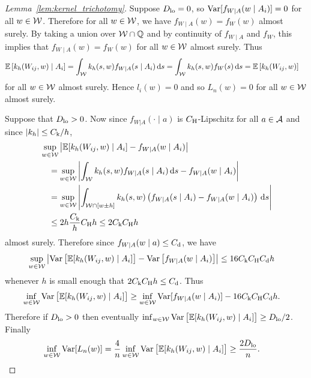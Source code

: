 \begin{proof}[Lemma~\ref{lem:kernel_trichotomy}]


  Suppose
  $D_{\textup{lo}} = 0$, so
  $\operatorname{Var}[f_{W \mid A}(w \mid A_i)] = 0$
  for all $w \in \mathcal{W}$.
  Therefore for all $w \in \mathcal{W}$,
  we have $f_{W \mid A}(w) = f_W(w)$ almost surely.
  By taking a union over $\mathcal{W} \cap \mathbb{Q}$
  and by continuity of $f_{W \mid A}$ and $f_W$,
  this implies that $f_{W \mid A}(w) = f_W(w)$
  for all $w \in \mathcal{W}$
  almost surely. Thus
  \begin{align*}
    \mathbb{E}\left[
      k_h(W_{i j},w) \mid A_i
    \right]
    &=
    \int_{\mathcal{W}}
    k_h(s,w)
    f_{W \mid A}(s \mid A_i)
    \,\mathrm{d}s
    =
    \int_{\mathcal{W}}
    k_h(s,w)
    f_W(s)
    \,\mathrm{d}s
    =
    \mathbb{E}\left[
      k_h(W_{i j},w)
    \right]
  \end{align*}
  for all $w \in \mathcal{W}$ almost surely.
  Hence $l_i(w) = 0$ and so $L_n(w) = 0$
  for all $w \in \mathcal{W}$ almost surely.


  Suppose that $D_{\textup{lo}} > 0$.
  Now since $f_{W|A}(\cdot \mid a)$ is $C_{\mathrm{H}}$-Lipschitz
  for all $a \in \mathcal{A}$ and since $|k_h| \leq C_{\mathrm{k}}/h$,
  \begin{align*}
    &\sup_{w \in \mathcal{W}}
    \left|
    \mathbb{E}[k_h(W_{i j},w) \mid A_i]
    - f_{W \mid A}(w \mid A_i)
    \right| \\
    &\quad=
    \sup_{w \in \mathcal{W}}
    \left|
    \int_{\mathcal{W}}
    k_h(s,w)
    f_{W \mid A}(s \mid A_i)
    \,\mathrm{d}s
    - f_{W \mid A}(w \mid A_i)
    \right| \\
    &\quad=
    \sup_{w \in \mathcal{W}}
    \left|
    \int_{\mathcal{W} \cap [w \pm h]}
    k_h(s,w)
    \left(
      f_{W \mid A}(s \mid A_i)
      - f_{W \mid A}(w \mid A_i)
    \right)
    \,\mathrm{d}s
    \right| \\
    &\quad\leq
    2h
    \frac{C_{\mathrm{k}}}{h}
    C_{\mathrm{H}} h
    \leq
    2 C_{\mathrm{k}} C_{\mathrm{H}} h
  \end{align*}
  almost surely.
  Therefore since $f_{W \mid A}(w \mid a) \leq C_{\mathrm{d}}$,
  we have
  \begin{align*}
    \sup_{w \in \mathcal{W}}
    \left|
    \operatorname{Var}\big[
      \mathbb{E}[k_h(W_{i j},w) \mid A_i]
    \big]
    - \operatorname{Var}\left[
      f_{W \mid A}(w \mid A_i)
    \right]
    \right|
    &\leq
    16 C_{\mathrm{k}} C_{\mathrm{H}} C_{\mathrm{d}} h
  \end{align*}
  whenever $h$ is small enough that
  $2 C_{\mathrm{k}} C_{\mathrm{H}} h \leq C_{\mathrm{d}}$. Thus
  \begin{align*}
    \inf_{w \in \mathcal{W}} \operatorname{Var}\big[\mathbb{E}[k_h(W_{i j},w) \mid A_i]\big]
    &\geq
    \inf_{w \in \mathcal{W}}\operatorname{Var}[f_{W \mid A}(w \mid A_i)]
    - 16 C_{\mathrm{k}} C_{\mathrm{H}} C_{\mathrm{d}} h.
  \end{align*}
  Therefore if
  $D_{\textup{lo}} > 0$
  then eventually
  $\inf_{w \in \mathcal{W}} \operatorname{Var}\big[\mathbb{E}[k_h(W_{i j},w) \mid A_i]\big] \geq D_{\textup{lo}}/2$.
  Finally
  \begin{align*}
    \inf_{w \in \mathcal{W}}\operatorname{Var}[L_n(w)]
    &=
    \frac{4}{n}
    \inf_{w \in \mathcal{W}}
    \operatorname{Var}\big[\mathbb{E}[k_h(W_{i j},w) \mid A_i]\big]
    \geq
    \frac{2 D_{\textup{lo}}}{n}.
  \end{align*}


\end{proof}
